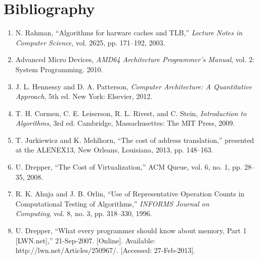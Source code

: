 \section{Bibliography}
  \begin{enumerate}
    \item N. Rahman, “Algorithms for harware caches and TLB,” \textit{Lecture
    Notes in Computer Science}, vol. 2625, pp. 171–192, 2003.
    
    \item Advanced Micro Devices, \textit{AMD64 Architecture Programmer’s
    Manual}, vol. 2: System Programming. 2010.
    
    \item  J. L. Hennessy and D. A. Patterson, \textit{Computer Architecture: A
    Quantitative Approach}, 5th ed. New York: Elsevier, 2012.
    
    \item T. H. Cormen, C. E. Leiserson, R. L. Rivest, and C. Stein,
    \textit{Introduction to Algorithms}, 3rd ed. Cambridge, Massachusettes: The
    MIT Press, 2009.
    
    \item T. Jurkiewicz and K. Mehlhorn, “The cost of address
    translation,” presented at the ALENEX13, New Orleans, Louisiana, 2013, pp.
    148–163.
    
    \item U. Drepper, “The Cost of Virtualization,” ACM Queue, vol. 6, no. 1,
    pp. 28–35, 2008.
    
    \item R. K. Ahuja and J. B. Orlin, “Use of Representative Operation Counts
    in Computational Testing of Algorithms,” 
    \textit{INFORMS Journal on\\Computing}, vol. 8, no. 3, pp. 318–330, 1996.
    
    \item U. Drepper, “What every programmer should know about memory, Part 1
    [LWN.net],” 21-Sep-2007. [Online]. Available:
    \\http://lwn.net/Articles/250967/. [Accessed: 27-Feb-2013].
    
  \end{enumerate}
